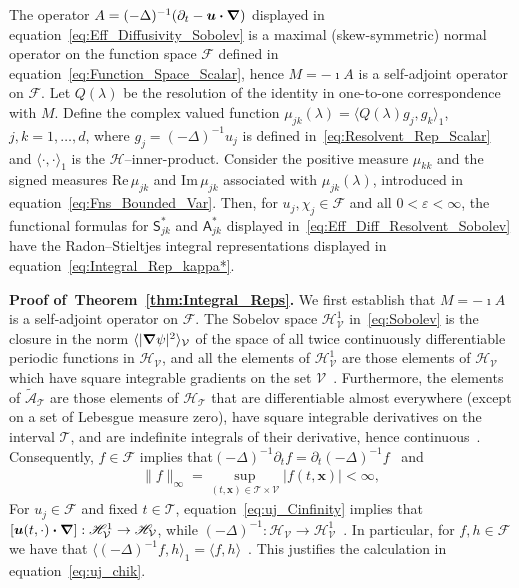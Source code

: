 \documentclass[leqno,onefignum,onetabnum]{siamltex1213}
\newcommand{\thmref}[1]{Theorem~\ref{#1}}
\newcommand\Real{\mbox{Re}\,} %
\newcommand\Imag{\mbox{Im}\,} %
\newcommand{\Tc}{\mathcal{T}}
\newcommand{\Vc}{\mathcal{V}}
\newcommand{\Sm}{\mathsf{S}}
\newcommand{\Am}{\mathsf{A}}
\newcommand{\Hs}{\mathscr{H}}
\newcommand{\As}{\mathscr{A}}
\newcommand{\Fs}{\mathscr{F}}
\newcommand\bnabla{\mbox{\boldmath${\nabla}$}}
\providecommand\bcdot{\boldsymbol{\cdot}}
\newcommand{\vecx}{\boldsymbol{x}}
\newcommand{\vecu}{\boldsymbol{u}}
\begin{document}
%
\begin{theorem}\label{thm:Integral_Reps}
  The operator $A=(-\Delta)^{-1}(\partial_t-\vecu\bcdot\bnabla)$ displayed in
  equation~\eqref{eq:Eff_Diffusivity_Sobolev} is a maximal
  (skew-symmetric) normal operator on the function space $\Fs$ defined
  in equation~\eqref{eq:Function_Space_Scalar}, hence $M=-\imath A$ is a
  self-adjoint operator on $\Fs$. Let $Q(\lambda)$ be the resolution of the
  identity in one-to-one correspondence with $M$. Define the complex
  valued   function $\mu_{jk}(\lambda)=\langle Q(\lambda)g_j,g_k\rangle_1$, $j,k=1,\ldots,d$, where
  $g_j=(-\Delta)^{-1}u_j$ is defined in~\eqref{eq:Resolvent_Rep_Scalar} and 
  $\langle\cdot,\cdot\rangle_1$ is the $\Hs$--inner-product. Consider the positive measure
  $\mu_{kk}$ and the signed measures $\Real\mu_{jk}$ and $\Imag\mu_{jk}$
  associated with $\mu_{jk}(\lambda)$, introduced in
  equation~\eqref{eq:Fns_Bounded_Var}.  Then, for $u_j,\chi_j\in\Fs$
  and all $0<\varepsilon<\infty$,
  the functional formulas for $\Sm^*_{jk}$ and $\Am^*_{jk}$ displayed
  in~\eqref{eq:Eff_Diff_Resolvent_Sobolev} have the 
  Radon--Stieltjes integral representations displayed in
  equation~\eqref{eq:Integral_Rep_kappa*}.   
% 
\end{theorem}
%

\textbf{Proof of~\thmref{thm:Integral_Reps}.}\hspace{1ex}
%
We first establish that $M=-\imath A$ is a self-adjoint operator on
$\Fs$. The Sobelov space $\Hs^1_{\Vc}$ in~\eqref{eq:Sobolev} is the
closure in the norm $\langle|\bnabla\psi|^2\rangle_{\Vc}$ of the space of all twice
continuously differentiable periodic functions in $\Hs_{\Vc}$, and all
the elements of $\Hs^1_{\Vc}$ are those elements of $\Hs_{\Vc}$ which
have square integrable gradients on the set
$\Vc$~\cite{Bhattacharya:AAP:1999:951}. Furthermore, the elements of
$\tilde{\As}_{\Tc}$ are those elements of $\Hs_{\Tc}$ that are
differentiable almost everywhere (except on a set of Lebesgue measure
zero), have square integrable derivatives on the interval
$\Tc$, and are indefinite integrals of their
derivative, hence continuous~\cite{Royden:1988:RA}. Consequently,
$f\in\Fs$ implies
that$(-\Delta)^{-1}\partial_{t}f=\partial_{t}(-\Delta)^{-1}f$~\cite{Folland:99:RealAnalysis,Stakgold:BVP:2000}
and~\cite{Stone:64,Royden:1988:RA}  
%
\begin{align}\label{eq:uj_Cinfinity}
  \|f\|_\infty=\sup_{(t,\vecx)\in\Tc\times\Vc}|f(t,\vecx)|<\infty,
\end{align}
%
For
$u_j\in\Fs$ and fixed $t\in\Tc$, equation~\eqref{eq:uj_Cinfinity} implies that
$[\vecu(t,\cdot)\bcdot\bnabla]:\Hs^1_{\Vc}\to\Hs_{\Vc}$, while
$(-\Delta)^{-1}:\Hs_{\Vc}\to\Hs^1_{\Vc}$~\cite{Bhattacharya:AAP:1999:951}. In
particular, for $f,h\in\Fs$ we have that
$\langle(-\Delta)^{-1}f,h\rangle_1=\langle f,h\rangle$~\cite{Bhattacharya:AAP:1999:951}. This 
justifies the calculation in equation~\eqref{eq:uj_chik}.  
\end{document}
